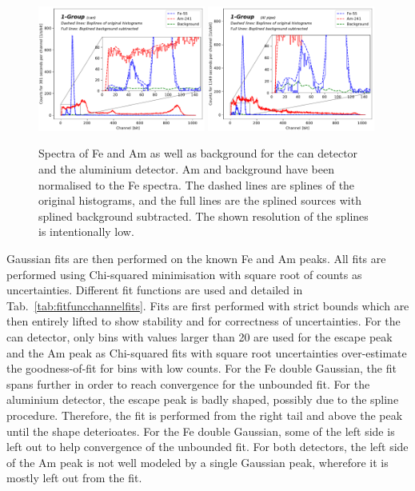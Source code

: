 \begin{figure}[htb]
  \includegraphics[width=0.49\textwidth,page=1]{graphics/bkgsubtraction.pdf}
  \includegraphics[width=0.49\textwidth,page=1]{graphics/alubkgsubtraction.pdf}
  \caption{Spectra of Fe and Am as well as background for the can detector and the aluminium detector. Am and background have been normalised to the Fe spectra. The dashed lines are splines of the original histograms, and the full lines are the splined sources with splined background subtracted. The shown resolution of the splines is intentionally low.}
  \label{fig:spectra}
\end{figure}

Gaussian fits are then performed on the known Fe and Am peaks. All fits are performed using Chi-squared minimisation with square root of counts as uncertainties. Different fit functions are used and detailed in Tab.~\ref{tab:fitfuncchannelfits}. Fits are first performed with strict bounds which are then entirely lifted to show stability and for correctness of uncertainties. For the can detector, only bins with values larger than 20 are used for the escape peak and the Am peak as Chi-squared fits with square root uncertainties over-estimate the goodness-of-fit for bins with low counts. For the Fe double Gaussian, the fit spans further in order to reach convergence for the unbounded fit. For the aluminium detector, the escape peak is badly shaped, possibly due to the spline procedure. Therefore, the fit is performed from the right tail and above the peak until the shape deterioates. For the Fe double Gaussian, some of the left side is left out to help convergence of the unbounded fit. For both detectors, the left side of the Am peak is not well modeled by a single Gaussian peak, wherefore it is mostly left out from the fit.

